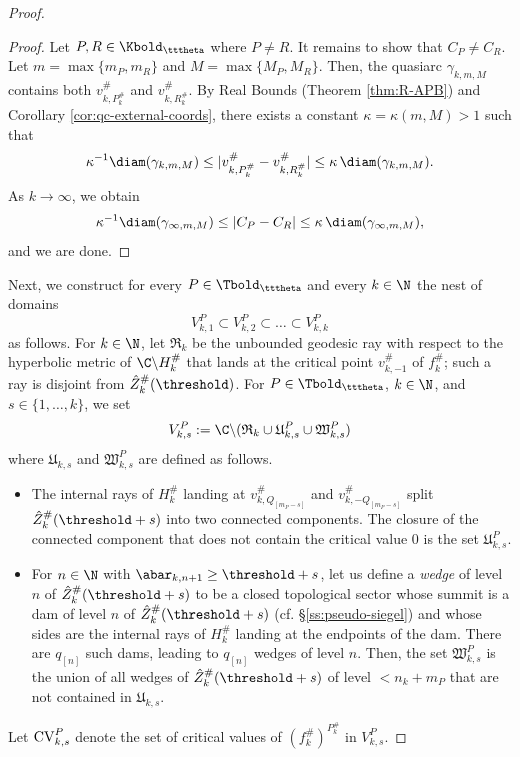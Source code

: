 \documentclass{amsart}
\begin{document}
\begin{proof}
\begin{proof}
        Let $P, R \in \Kbold_{\tttheta}$ where $P \neq R$.
        It remains to show that $C_P \neq C_R$.
        Let $m = \max\{m_P,m_R\}$ and $M = \max\{M_P, M_R\}$.
        Then, the quasiarc $\gamma_{k,m,M}$ contains both $v^{\#}_{k,P_k^{\#}}$ and $v^{\#}_{k,R_k^{\#}}$.
        By Real Bounds (Theorem \ref{thm:R-APB}) and Corollary \ref{cor:qc-external-coords}, there exists a constant $\kappa=\kappa(m,M) > 1$ such that
        \[
            \kappa^{-1} \diam(\gamma_{k,m,M}) \leq |v^{\#}_{k,P_k^{\#}} - v^{\#}_{k,R_k^{\#}}| \leq \kappa \,\diam(\gamma_{k,m,M}).
        \]
        As $k \to \infty$, we obtain 
        \[
            \kappa^{-1} \diam(\gamma_{\infty,m,M}) \leq |C_P - C_R| \leq \kappa \,\diam(\gamma_{\infty,m,M}),
        \]
        and we are done.
    \end{proof}

    Next, we construct for every $P \in \Tbold_{\tttheta}$ and every $k \in \N$ the nest of domains 
    \[
        V^P_{k,1} \subset V^P_{k,2} \subset \ldots \subset V^P_{k,k}
    \]
    as follows.
    For $k \in \N$, let $\mathfrak{R}_k$ be the unbounded geodesic ray with respect to the hyperbolic metric of $\C\backslash H_k^{\#}$ that lands at the critical point $v^{\#}_{k,-1}$ of $f_k^{\#}$; such a ray is disjoint from $\hat{Z}_k^{\#}(\threshold)$.
    For $P \in \Tbold_{\tttheta}$, $k \in \N$, and $s \in \{1,\ldots,k\}$, we set
    \[
        V^P_{k,s} := \C \backslash ( \mathfrak{R}_k \cup \mathfrak{U}^P_{k,s} \cup \mathfrak{W}_{k,s}^P )
    \]
    where $\mathfrak{U}_{k,s}$ and $\mathfrak{W}_{k,s}^P$ are defined as follows.
    \begin{itemize}
        \item The internal rays of $H_k^{\#}$ landing at $v^{\#}_{k,Q_{[m_P-s]}}$ and $v^{\#}_{k,-Q_{[m_P-s]}}$ split $\hat{Z}_k^{\#}(\threshold + s)$ into two connected components.
        The closure of the connected component that does not contain the critical value $0$ is the set $\mathfrak{U}^P_{k,s}$.
        \item For $n \in \N$ with $\abar_{k,n+1} \geq \threshold+s$, let us define a \emph{wedge} of level $n$ of $\hat{Z}_k^{\#}(\threshold+s)$ to be a closed topological sector whose summit is a dam of level $n$ of $\hat{Z}_k^{\#}(\threshold+s)$ (cf. \S\ref{ss:pseudo-siegel}) and whose sides are the internal rays of $H_k^{\#}$ landing at the endpoints of the dam. 
        There are $q_{[n]}$ such dams, leading to $q_{[n]}$ wedges of level $n$.
        Then, the set $\mathfrak{W}_{k,s}^P$ is the union of all wedges of $\hat{Z}_k^{\#}(\threshold+s)$ of level $< n_k + m_P$ that are not contained in $\mathfrak{U}_{k,s}$.
    \end{itemize}
    Let $\textnormal{CV}^P_{k,s}$ denote the set of critical values of $(f_k^{\#})^{P_k^{\#}}$ in $V^P_{k,s}$.
    

\end{proof}
\end{document}
